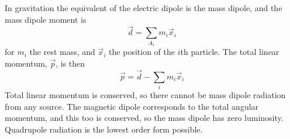 In gravitation the equivalent of the electric dipole is the mass
dipole, and the mass dipole moment is
\begin{equation}
  \label{eq:34}
  \vec{d} = \sum_{A_i} m_i \vec{x}_i
\end{equation}
for $m_i$ the rest mass, and $\vec{x}_i$ the position of the $i$th
particle. The total linear momentum, $\vec{p}$, is then
\begin{equation}
  \label{eq:35}
  \vec{p} = \vec{d} - \sum_i m_i \vec{x}_i
\end{equation}
Total linear momentum is conserved, so there cannot be mass dipole
radiation from any source. The magnetic dipole corresponds to the
total angular momentum, and this too is conserved, so the mass dipole
has zero luminosity. Quadrupole radiation is the lowest order form
possible.

